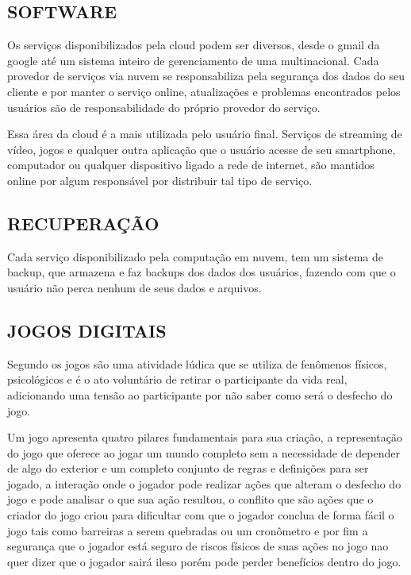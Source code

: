 \begin{justify}
    \subsection{SOFTWARE}
    Os serviços disponibilizados pela cloud podem ser diversos, desde o gmail da google até
    um sistema inteiro de gerenciamento de uma multinacional. Cada provedor de serviços via
    nuvem se responsabiliza pela segurança dos dados do seu cliente e por manter o serviço
    online, atualizações e problemas encontrados pelos usuários são de responsabilidade do
    próprio provedor do serviço. \cite{taurion2009cloud}

    Essa área da cloud é a mais utilizada pelo usuário final. Serviços de streaming de vídeo,
    jogos e qualquer outra aplicação que o usuário acesse de seu smartphone, computador ou
    qualquer dispositivo ligado a rede de internet, são mantidos online por algum responsável
    por distribuir tal tipo de serviço.

    \subsection{RECUPERAÇÃO}
    Cada serviço disponibilizado pela computação em nuvem, tem um sistema de backup, que
    armazena e faz backups dos dados dos usuários, fazendo com que o usuário não perca
    nenhum de seus dados e arquivos.\cite{rashid2019cloud}

    \subsection{JOGOS DIGITAIS}
    Segundo \cite{huizinga1971homo} os jogos são uma atividade lúdica que se utiliza de fenômenos
    físicos, psicológicos e é o ato voluntário de retirar o participante da vida real, adicionando
    uma tensão ao participante por não saber como será o desfecho do jogo.

    Um jogo apresenta quatro pilares fundamentais para sua criação, a representação do jogo
    que oferece ao jogar um mundo completo sem a necessidade de depender de algo do
    exterior e um completo conjunto de regras e definições para ser jogado, a interação onde o
    jogador pode realizar ações que alteram o desfecho do jogo e pode analisar o que sua ação
    resultou, o conflito que são ações que o criador do jogo criou para dificultar com que o
    jogador conclua de forma fácil o jogo tais como barreiras a serem quebradas ou um
    cronômetro e por fim a segurança que o jogador está seguro de riscos físicos de suas ações
    no jogo nao quer dizer que o jogador sairá ileso porém pode perder benefícios dentro do
    jogo. \cite{crawford1984art}


\end{justify}
